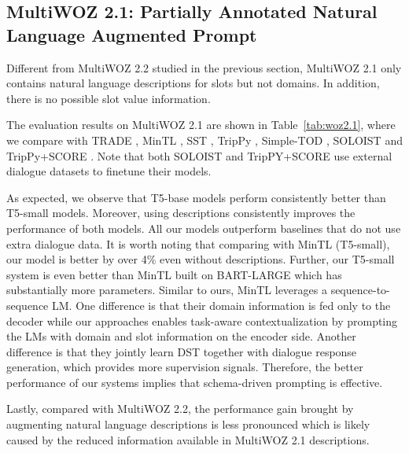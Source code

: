 \documentclass[11pt]{article}
\begin{document}
\subsection{MultiWOZ 2.1: Partially Annotated Natural Language Augmented Prompt}
Different from MultiWOZ 2.2 studied in the previous section, MultiWOZ 2.1 only contains natural language descriptions for slots but not domains.
In addition, there is no possible slot value information.

The evaluation results on MultiWOZ 2.1 are shown in Table~\ref{tab:woz2.1}, where we compare with 
TRADE \cite{wu2019transferable}, MinTL \cite{lin-etal-2020-mintl}, SST \cite{chen2020schema}, TripPy \cite{heck2020trippy}, Simple-TOD \cite{hosseini2020simple}, SOLOIST \cite{peng2020soloist} and TripPy+SCORE \cite{yu2020score}.
Note that both SOLOIST and TripPY+SCORE use external dialogue datasets to finetune their models.

As expected, we observe that T5-base models perform consistently better than T5-small models.
Moreover, using descriptions consistently improves the performance of both models.
All our models outperform baselines that do not use extra dialogue data. 
It is worth noting that comparing with MinTL (T5-small), our model is better by over 4\% even without descriptions. 
Further, our T5-small system is even better than MinTL built on BART-LARGE \cite{lewis-etal-2020-bart} which has substantially more parameters.
Similar to ours, MinTL leverages a sequence-to-sequence LM.
One difference is that their domain information is fed only to the decoder while our approaches enables task-aware contextualization by prompting the LMs
with domain and slot information on the encoder side.
Another difference is that they jointly learn DST together with dialogue response generation, which provides more supervision signals.
Therefore, the better performance of our systems implies that schema-driven prompting is effective. 

Lastly, compared with MultiWOZ 2.2, the performance gain brought by augmenting natural language descriptions is less pronounced which is likely caused by the reduced information available in MultiWOZ 2.1 descriptions.
\end{document}
